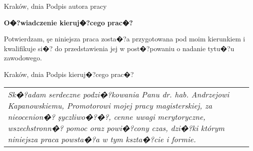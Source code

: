 \documentclass[12pt,a4paper]{mwrep}
\begin{document}
\vspace{2cm}
\begin{flushleft}
Kraków, dnia \hfill Podpis autora pracy
\end{flushleft}

\vspace{5cm}
\begin{flushleft}
\textbf{\large O�?wiadczenie kieruj�?cego prac�?}
\end{flushleft}

Potwierdzam, şe niniejsza praca zosta�?a przygotowana 
pod moim kierunkiem i kwalifikuje si�? do przedstawienia jej
w post�?powaniu o nadanie tytu�?u zawodowego.

\vspace{2cm}
\begin{flushleft}
Kraków, dnia  \hfill Podpis kieruj�?cego prac�?
\end{flushleft}


\newpage


\thispagestyle{empty}

\hbox{}\vfill
\begin{flushright}
\begin{tabular}{p{9 cm}}
\textsl{Sk�?adam serdeczne podzi�?kowania Panu dr. hab. 
Andrzejowi Kapanowskiemu, Promotorowi mojej pracy magisterskiej,
za nieocenion�? şyczliwo�?�?, cenne uwagi merytoryczne, wszechstronn�?
pomoc oraz powi�?cony czas, dzi�?ki którym niniejsza praca powsta�?a w 
tym kszta�?cie i formie.}
\end{tabular}
\end{flushright}

\end{document}
